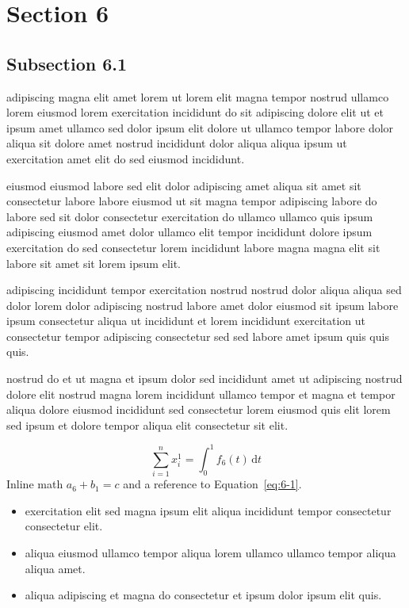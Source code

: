 \documentclass{article}
\begin{document}
\section{Section 6}\label{sec:6}
\subsection{Subsection 6.1}\label{sec:6-1}
adipiscing magna elit amet lorem ut lorem elit magna tempor nostrud ullamco lorem eiusmod lorem exercitation incididunt do sit adipiscing dolore elit ut et ipsum amet ullamco sed dolor ipsum elit dolore ut ullamco tempor labore dolor aliqua sit dolore amet nostrud incididunt dolor aliqua aliqua ipsum ut exercitation amet elit do sed eiusmod incididunt.

eiusmod eiusmod labore sed elit dolor adipiscing amet aliqua sit amet sit consectetur labore labore eiusmod ut sit magna tempor adipiscing labore do labore sed sit dolor consectetur exercitation do ullamco ullamco quis ipsum adipiscing eiusmod amet dolor ullamco elit tempor incididunt dolore ipsum exercitation do sed consectetur lorem incididunt labore magna magna elit sit labore sit amet sit lorem ipsum elit.

adipiscing incididunt tempor exercitation nostrud nostrud dolor aliqua aliqua sed dolor lorem dolor adipiscing nostrud labore amet dolor eiusmod sit ipsum labore ipsum consectetur aliqua ut incididunt et lorem incididunt exercitation ut consectetur tempor adipiscing consectetur sed sed labore amet ipsum quis quis quis.

nostrud do et ut magna et ipsum dolor sed incididunt amet ut adipiscing nostrud dolore elit nostrud magna lorem incididunt ullamco tempor et magna et tempor aliqua dolore eiusmod incididunt sed consectetur lorem eiusmod quis elit lorem sed ipsum et dolore tempor aliqua elit consectetur sit elit.

\begin{equation}\label{eq:6-1}
  \sum_{i=1}^{n} x_i^{1} = \int_0^1 f_{6}(t)\,\mathrm{d}t
\end{equation}
Inline math $a_{6} + b_{1} = c$ and a reference to Equation~\eqref{eq:6-1}.

\begin{itemize}
  \item exercitation elit sed magna ipsum elit aliqua incididunt tempor consectetur consectetur elit.
  \item aliqua eiusmod ullamco tempor aliqua lorem ullamco ullamco tempor aliqua aliqua amet.
  \item aliqua adipiscing et magna do consectetur et ipsum dolor ipsum elit quis.
\end{itemize}
\end{document}
